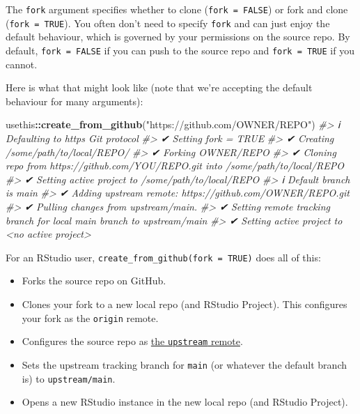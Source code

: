 \documentclass[
]{book}
\newenvironment{Shaded}{\begin{snugshade}}{\end{snugshade}}
\newcommand{\CommentTok}[1]{\textcolor[rgb]{0.56,0.35,0.01}{\textit{#1}}}
\newcommand{\FunctionTok}[1]{\textcolor[rgb]{0.13,0.29,0.53}{\textbf{#1}}}
\newcommand{\NormalTok}[1]{#1}
\newcommand{\SpecialCharTok}[1]{\textcolor[rgb]{0.81,0.36,0.00}{\textbf{#1}}}
\newcommand{\StringTok}[1]{\textcolor[rgb]{0.31,0.60,0.02}{#1}}
\providecommand{\tightlist}{%
  \setlength{\itemsep}{0pt}\setlength{\parskip}{0pt}}
\begin{document}
The \texttt{fork} argument specifies whether to clone (\texttt{fork\ =\ FALSE}) or fork and clone (\texttt{fork\ =\ TRUE}).
You often don't need to specify \texttt{fork} and can just enjoy the default behaviour, which is governed by your permissions on the source repo.
By default, \texttt{fork\ =\ FALSE} if you can push to the source repo and \texttt{fork\ =\ TRUE} if you cannot.

Here is what that might look like (note that we're accepting the default behaviour for many arguments):

\begin{Shaded}
\begin{Highlighting}[]
\NormalTok{usethis}\SpecialCharTok{::}\FunctionTok{create\_from\_github}\NormalTok{(}\StringTok{"https://github.com/OWNER/REPO"}\NormalTok{)}
\CommentTok{\#\textgreater{} ℹ Defaulting to \textquotesingle{}https\textquotesingle{} Git protocol}
\CommentTok{\#\textgreater{} ✔ Setting \textasciigrave{}fork = TRUE\textasciigrave{}}
\CommentTok{\#\textgreater{} ✔ Creating \textquotesingle{}/some/path/to/local/REPO/\textquotesingle{}}
\CommentTok{\#\textgreater{} ✔ Forking \textquotesingle{}OWNER/REPO\textquotesingle{}}
\CommentTok{\#\textgreater{} ✔ Cloning repo from \textquotesingle{}https://github.com/YOU/REPO.git\textquotesingle{} into \textquotesingle{}/some/path/to/local/REPO\textquotesingle{}}
\CommentTok{\#\textgreater{} ✔ Setting active project to \textquotesingle{}/some/path/to/local/REPO\textquotesingle{}}
\CommentTok{\#\textgreater{} ℹ Default branch is \textquotesingle{}main\textquotesingle{}}
\CommentTok{\#\textgreater{} ✔ Adding \textquotesingle{}upstream\textquotesingle{} remote: \textquotesingle{}https://github.com/OWNER/REPO.git\textquotesingle{}}
\CommentTok{\#\textgreater{} ✔ Pulling changes from \textquotesingle{}upstream/main\textquotesingle{}.}
\CommentTok{\#\textgreater{} ✔ Setting remote tracking branch for local \textquotesingle{}main\textquotesingle{} branch to \textquotesingle{}upstream/main\textquotesingle{}}
\CommentTok{\#\textgreater{} ✔ Setting active project to \textquotesingle{}\textless{}no active project\textgreater{}\textquotesingle{}}
\end{Highlighting}
\end{Shaded}

For an RStudio user, \texttt{create\_from\_github(fork\ =\ TRUE)} does all of this:

\begin{itemize}
\tightlist
\item
  Forks the source repo on GitHub.
\item
  Clones your fork to a new local repo (and RStudio Project).
  This configures your fork as the \texttt{origin} remote.
\item
  Configures the source repo as \hyperref[upstream-changes]{the \texttt{upstream} remote}.
\item
  Sets the upstream tracking branch for \texttt{main} (or whatever the default branch
  is) to \texttt{upstream/main}.
\item
  Opens a new RStudio instance in the new local repo (and RStudio Project).
\end{itemize}
\end{document}
